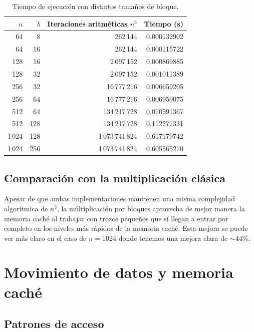 \documentclass[a4paper,12pt]{article}
\begin{document}
\begin{table}[H]
    \centering
    \caption{Tiempo de ejecución con distintos tamaños de bloque.}
    \label{tab:blocked-times}
    \begin{tabular}{r r r r}
        \toprule
        \(n\) & \(b\) & Iteraciones aritméticas \(n^3\) & Tiempo (s) \\
        \midrule
        64  & 8  & 262\,144       & 0.000132902 \\
        64  & 16 & 262\,144       & 0.000115722 \\
        128 & 16 & 2\,097\,152    & 0.000869885 \\
        128 & 32 & 2\,097\,152    & 0.001011389 \\
        256 & 32 & 16\,777\,216  & 0.006659205 \\
        256 & 64 & 16\,777\,216  & 0.006959075 \\
        512 & 64 & 134\,217\,728 & 0.070591367 \\
        512 & 128 & 134\,217\,728 & 0.112277331 \\
        1\,024 & 128 & 1\,073\,741\,824 & 0.617179742 \\
        1\,024 & 256 & 1\,073\,741\,824 & 0.605565270 \\
        \bottomrule
    \end{tabular}
\end{table}

\subsection{Comparación con la multiplicación clásica}

Apesar de que ambas implementaciones mantienen una misma complejidad algorítmica de $n^3$, la múltiplicación por bloques aprovecha de mejor manera la memoria caché al trabajar con trozos pequeños que sí llegan a entrar por completo en los niveles más rápidos de la memoria caché. Esta mejora se puede ver más claro en el caso de $n=1024$ donde tenemos una mejora clara de $\sim44\%$.

\section{Movimiento de datos y memoria caché}

\subsection{Patrones de acceso}
\end{document}
